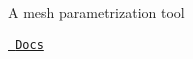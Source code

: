 \label{index_md_README}%
%
 A mesh parametrization tool

\href{https://charlesaverill.github.io/mesh-parametrization}{\texttt{ Docs}} 